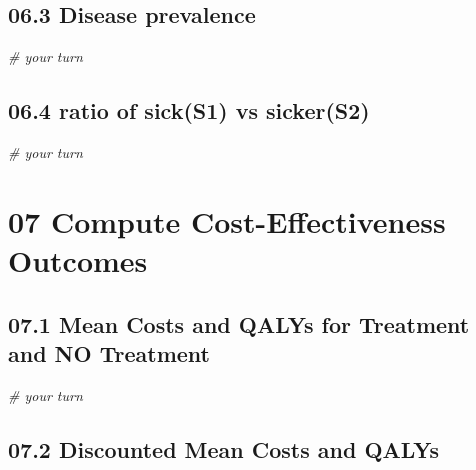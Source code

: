 \documentclass[
]{article}
\newenvironment{Shaded}{\begin{snugshade}}{\end{snugshade}}
\newcommand{\CommentTok}[1]{\textcolor[rgb]{0.56,0.35,0.01}{\textit{#1}}}
\begin{document}
\hypertarget{disease-prevalence}{%
\subsection{06.3 Disease prevalence}\label{disease-prevalence}}

\begin{Shaded}
\begin{Highlighting}[]
\CommentTok{# your turn}
\end{Highlighting}
\end{Shaded}

\hypertarget{ratio-of-sicks1-vs-sickers2}{%
\subsection{06.4 ratio of sick(S1) vs
sicker(S2)}\label{ratio-of-sicks1-vs-sickers2}}

\begin{Shaded}
\begin{Highlighting}[]
\CommentTok{# your turn}
\end{Highlighting}
\end{Shaded}

\hypertarget{compute-cost-effectiveness-outcomes}{%
\section{07 Compute Cost-Effectiveness
Outcomes}\label{compute-cost-effectiveness-outcomes}}

\hypertarget{mean-costs-and-qalys-for-treatment-and-no-treatment}{%
\subsection{07.1 Mean Costs and QALYs for Treatment and NO
Treatment}\label{mean-costs-and-qalys-for-treatment-and-no-treatment}}

\begin{Shaded}
\begin{Highlighting}[]
\CommentTok{# your turn}
\end{Highlighting}
\end{Shaded}

\hypertarget{discounted-mean-costs-and-qalys}{%
\subsection{07.2 Discounted Mean Costs and
QALYs}\label{discounted-mean-costs-and-qalys}}
\end{document}
